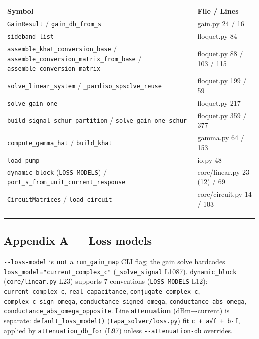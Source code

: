 \documentclass[
  10pt,
]{article}
\newcounter{none} %
\begin{document}
{\def\LTcaptype{none} %
\begin{longtable}[]{@{}
  >{\raggedright\arraybackslash}p{}
  >{\raggedright\arraybackslash}p{}@{}}
\toprule\noalign{}
\begin{minipage}[b]{\linewidth}\raggedright
Symbol
\end{minipage} & \begin{minipage}[b]{\linewidth}\raggedright
File / Lines
\end{minipage} \\
\midrule\noalign{}
\endhead
\bottomrule\noalign{}
\endlastfoot
\texttt{GainResult} / \texttt{gain\_db\_from\_s} & gain.py 24 / 16 \\
\texttt{sideband\_list} & floquet.py 84 \\
\texttt{assemble\_khat\_conversion\_base} /
\texttt{assemble\_conversion\_matrix\_from\_base} /
\texttt{assemble\_conversion\_matrix} & floquet.py 88 / 103 / 115 \\
\texttt{solve\_linear\_system} / \texttt{\_pardiso\_spsolve\_reuse} &
floquet.py 199 / 59 \\
\texttt{solve\_gain\_one} & floquet.py 217 \\
\texttt{build\_signal\_schur\_partition} /
\texttt{solve\_gain\_one\_schur} & floquet.py 359 / 377 \\
\texttt{compute\_gamma\_hat} / \texttt{build\_khat} & gamma.py 64 /
153 \\
\texttt{load\_pump} & io.py 48 \\
\texttt{dynamic\_block} (\texttt{LOSS\_MODELS}) /
\texttt{port\_s\_from\_unit\_current\_response} & core/linear.py 23 (12)
/ 69 \\
\texttt{CircuitMatrices} / \texttt{load\_circuit} & core/circuit.py 14 /
103 \\
\end{longtable}
}

\begin{center}\rule{0.5\linewidth}{0.5pt}\end{center}

\subsection{Appendix A --- Loss models}\label{appendix-a-loss-models}

\texttt{-\/-loss-model} is \textbf{not} a \texttt{run\_gain\_map} CLI
flag; the gain solve hardcodes
\texttt{loss\_model="current\_complex\_c"} (\texttt{\_solve\_signal}
L1087). \texttt{dynamic\_block} (\texttt{core/linear.py} L23) supports 7
conventions (\texttt{LOSS\_MODELS} L12): \texttt{current\_complex\_c},
\texttt{real\_capacitance}, \texttt{conjugate\_complex\_c},
\texttt{complex\_c\_sign\_omega}, \texttt{conductance\_signed\_omega},
\texttt{conductance\_abs\_omega},
\texttt{conductance\_abs\_omega\_opposite}. Line \textbf{attenuation}
(dBm→current) is separate: \texttt{default\_loss\_model()}
(\texttt{twpa\_solver/loss.py}) fit \texttt{c\ +\ a√f\ +\ b·f}, applied
by \texttt{attenuation\_db\_for} (L97) unless
\texttt{-\/-attenuation-db} overrides.
\end{document}
